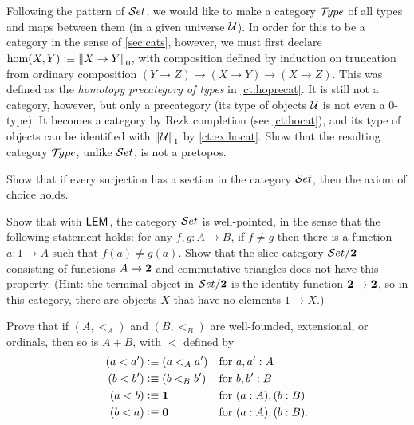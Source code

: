 \sectionExercises

\begin{ex}
  Following the pattern of $\mathcal{S}et$, we would like to make a category $\mathcal{T}\!ype$ of all types and maps between them (in a given universe $\mathcal{U}$).  In order for this to be a category in the sense of \autoref{sec:cats}, however, we must first declare $\hom(X,Y) \vcentcolon\equiv \mathopen{}\left\Vert X\to Y\right\Vert_{0}\mathclose{}$, with composition defined by induction on truncation from ordinary composition $(Y\to Z) \to (X\to Y) \to (X\to Z)$.  This was defined as the \emph{homotopy precategory of types} in \autoref{ct:hoprecat}.  It is still not a category, however, but only a precategory (its type of objects $\mathcal{U}$ is not even a $0$-type).  It becomes a category by Rezk completion
  (see \autoref{ct:hocat}), and its type of objects can be identified with $\mathopen{}\left\Vert \mathcal{U}\right\Vert_{1}\mathclose{}$ by \autoref{ct:ex:hocat}.  Show that the resulting category $\mathcal{T}\!ype$, unlike $\mathcal{S}et$, is not a pretopos.
\end{ex}

\begin{ex}
  Show that if every surjection has a section in the category $\mathcal{S}et$, then the axiom of choice holds.
\end{ex}

\begin{ex}\label{ex:well-pointed}
  Show that with $\mathsf{LEM}_{}$, the category $\mathcal{S}et$ is well-pointed,
  in the sense that the following statement holds: for any $f, g : A\to B$, if $f \neq g$ then there is a function $a : 1\to A$ such that $f(a) \neq g(a)$.
  Show that the slice category
  $\mathcal{S}et/\mathbf{2}$ consisting of functions $A\to \mathbf{2}$ and commutative triangles does not have this property.
  (Hint: the terminal object in $\mathcal{S}et/\mathbf{2}$ is the identity function $\mathbf{2} \to \mathbf{2}$, so in this category, there are objects $X$ that have no elements $1\to X$.)
\end{ex}

\begin{ex}
  Prove that if $(A,<_A)$ and $(B,<_B)$ are well-founded, extensional, or ordinals, then so is $A+B$, with $<$ defined by
  \begin{align*}
    (a<a') &\vcentcolon\equiv (a<_A a') & \text{for }& a,a':A\\
    (b<b') &\vcentcolon\equiv (b<_B b') & \text{for }& b,b':B\\
    (a<b) &\vcentcolon\equiv \mathbf{1}      & \text{for }& (a:A),(b:B)\\
    (b<a) &\vcentcolon\equiv \mathbf{0}    & \text{for }& (a:A),(b:B).
  \end{align*}
\end{ex}

